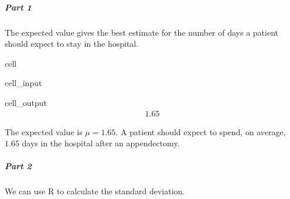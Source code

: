 \documentclass[letterpaper,10pt,english]{jupyterBook}
\begin{document}
\subparagraph{Part 1}
\label{\detokenize{Ch3 Probability/3.5 Discrete Probability Distributions:id6}}
\sphinxAtStartPar
The expected value gives the best estimate for the number of days a patient should expect to stay in the hospital.

\begin{sphinxuseclass}{cell}\begin{sphinxVerbatimInput}

\begin{sphinxuseclass}{cell_input}
\begin{sphinxVerbatim}[commandchars=\\\{\}]

\end{sphinxVerbatim}

\end{sphinxuseclass}\end{sphinxVerbatimInput}
\begin{sphinxVerbatimOutput}

\begin{sphinxuseclass}{cell_output}\begin{equation*}
\begin{split}1.65\end{split}
\end{equation*}
\end{sphinxuseclass}\end{sphinxVerbatimOutput}

\end{sphinxuseclass}
\sphinxAtStartPar
The expected value is \(\mu = 1.65\). A patient should expect to spend, on average, \(1.65\) days in the hospital after an appendectomy.


\subparagraph{Part 2}
\label{\detokenize{Ch3 Probability/3.5 Discrete Probability Distributions:id7}}
\sphinxAtStartPar
We can use R to calculate the standard deviation.
\end{document}
